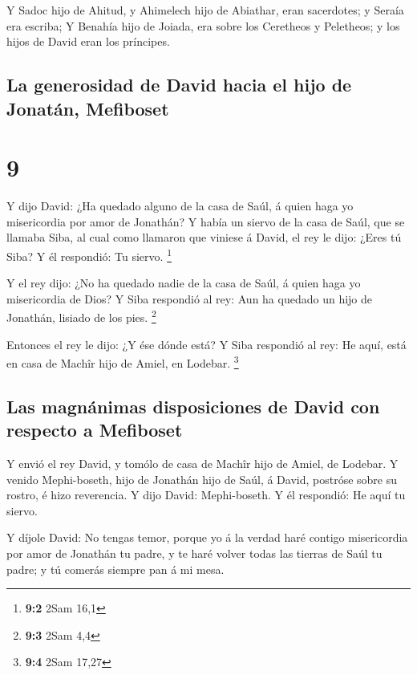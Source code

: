  Y Sadoc hijo de Ahitud, y Ahimelech hijo de Abiathar, eran
sacerdotes; y Seraía era escriba;  Y Benahía hijo de
Joiada, era sobre los Ceretheos y Peletheos; y los hijos de David eran
los príncipes.

\hypertarget{la-generosidad-de-david-hacia-el-hijo-de-jonatuxe1n-mefiboset}{%
\subsection{La generosidad de David hacia el hijo de Jonatán,
Mefiboset}\label{la-generosidad-de-david-hacia-el-hijo-de-jonatuxe1n-mefiboset}}

\hypertarget{section-8}{%
\section{9}\label{section-8}}

 Y dijo David: ¿Ha quedado alguno de la casa de Saúl, á
quien haga yo misericordia por amor de Jonathán?  Y había un
siervo de la casa de Saúl, que se llamaba Siba, al cual como llamaron
que viniese á David, el rey le dijo: ¿Eres tú Siba? Y él respondió: Tu
siervo. \footnote{\textbf{9:2} 2Sam 16,1}

 Y el rey dijo: ¿No ha quedado nadie de la casa de Saúl, á
quien haga yo misericordia de Dios? Y Siba respondió al rey: Aun ha
quedado un hijo de Jonathán, lisiado de los pies. \footnote{\textbf{9:3}
  2Sam 4,4}

 Entonces el rey le dijo: ¿Y ése dónde está? Y Siba
respondió al rey: He aquí, está en casa de Machîr hijo de Amiel, en
Lodebar. \footnote{\textbf{9:4} 2Sam 17,27}

\hypertarget{las-magnuxe1nimas-disposiciones-de-david-con-respecto-a-mefiboset}{%
\subsection{Las magnánimas disposiciones de David con respecto a
Mefiboset}\label{las-magnuxe1nimas-disposiciones-de-david-con-respecto-a-mefiboset}}

 Y envió el rey David, y tomólo de casa de Machîr hijo de
Amiel, de Lodebar.  Y venido Mephi-boseth, hijo de Jonathán
hijo de Saúl, á David, postróse sobre su rostro, é hizo reverencia. Y
dijo David: Mephi-boseth. Y él respondió: He aquí tu siervo.

 Y díjole David: No tengas temor, porque yo á la verdad haré
contigo misericordia por amor de Jonathán tu padre, y te haré volver
todas las tierras de Saúl tu padre; y tú comerás siempre pan á mi mesa.

